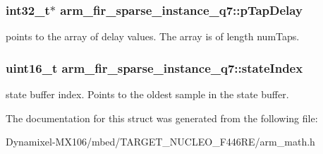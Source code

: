 \subsubsection[{\texorpdfstring{p\+Tap\+Delay}{pTapDelay}}]{\setlength{\rightskip}{0pt plus 5cm}int32\+\_\+t$\ast$ arm\+\_\+fir\+\_\+sparse\+\_\+instance\+\_\+q7\+::p\+Tap\+Delay}\hypertarget{structarm__fir__sparse__instance__q7_ac625393c84bc0342ffdf26fc4eba1ac1}{}\label{structarm__fir__sparse__instance__q7_ac625393c84bc0342ffdf26fc4eba1ac1}
points to the array of delay values. The array is of length num\+Taps. 
\subsubsection[{\texorpdfstring{state\+Index}{stateIndex}}]{\setlength{\rightskip}{0pt plus 5cm}uint16\+\_\+t arm\+\_\+fir\+\_\+sparse\+\_\+instance\+\_\+q7\+::state\+Index}\hypertarget{structarm__fir__sparse__instance__q7_a2d2e65473fe3a3f2b953b4e0b60824df}{}\label{structarm__fir__sparse__instance__q7_a2d2e65473fe3a3f2b953b4e0b60824df}
state buffer index. Points to the oldest sample in the state buffer. 

The documentation for this struct was generated from the following file\+:\begin{DoxyCompactItemize}
\item 
Dynamixel-\/\+M\+X106/mbed/\+T\+A\+R\+G\+E\+T\+\_\+\+N\+U\+C\+L\+E\+O\+\_\+\+F446\+R\+E/arm\+\_\+math.\+h\end{DoxyCompactItemize}
